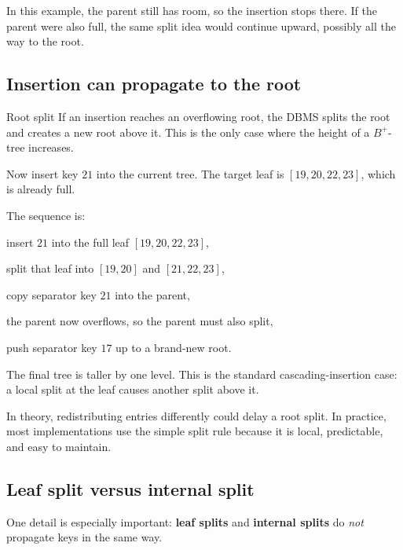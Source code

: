\documentclass[../../dis.tex]{subfiles}
\begin{document}
In this example, the parent still has room, so the insertion stops there. If the parent were also full, the same split idea would continue upward, possibly all the way to the root.

\subsection{Insertion can propagate to the root}
\begin{concept}{Root split}
If an insertion reaches an overflowing root, the DBMS splits the root and creates a new root above it. This is the only case where the height of a \mbox{$B^+$-tree} increases.
\end{concept}

Now insert key \(21\) into the current tree. The target leaf is \([19,20,22,23]\), which is already full.

\begin{schema}
{\resizebox{0.98\textwidth}{!}{}}\par}
\end{schema}

The sequence is:
\begin{dashlist}
    \item insert \(21\) into the full leaf \([19,20,22,23]\),
    \item split that leaf into \([19,20]\) and \([21,22,23]\),
    \item copy separator key \(21\) into the parent,
    \item the parent now overflows, so the parent must also split,
    \item push separator key \(17\) up to a brand-new root.
\end{dashlist}

The final tree is taller by one level. This is the standard cascading-insertion case: a local split at the leaf causes another split above it.

In theory, redistributing entries differently could delay a root split. In practice, most implementations use the simple split rule because it is local, predictable, and easy to maintain.

\subsection{Leaf split versus internal split}
One detail is especially important: \textbf{leaf splits} and \textbf{internal splits} do \emph{not} propagate keys in the same way.
\end{document}
